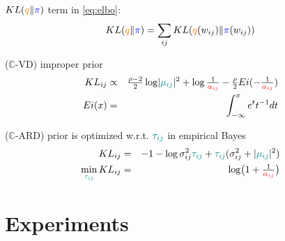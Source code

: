 \documentclass{beamer}
\newcommand{\real}{\mathbb{R}}
\newcommand{\cplx}{\mathbb{C}}
\begin{document}
\begin{frame}[c]{\insertsection}

  \bigskip
  $\mathop{KL}({\color{orange} q} \| {\color{blue} \pi})$ term in \eqref{eq:elbo}:
  \begin{equation*}
    \mathop{KL}({\color{orange} q} \| {\color{blue} \pi})
      = \sum_{ij} \mathop{KL}({\color{orange} q}(w_{ij}) \| {\color{blue} \pi}(w_{ij}))
  \end{equation*}

  \bigskip
  ($\cplx$-VD) improper prior
  \begin{eqnarray*}
    \mathop{KL}\nolimits_{ij}
      &\propto&
        \tfrac{\rho - 2}2 \log \lvert {\color{teal} \mu_{ij}} \rvert^2
        + \log \tfrac1{{\color{red} \alpha_{ij}}}
        - \tfrac\rho2 Ei( - \tfrac1{{\color{red} \alpha_{ij}}})
      \\
    Ei(x) &=& \int_{-\infty}^x e^t t^{-1} dt
  \end{eqnarray*}

  \bigskip
  ($\cplx$-ARD) prior is optimized w.r.t. ${\color{teal} \tau_{ij}}$ in empirical Bayes
  \begin{eqnarray*}
    \mathop{KL}\nolimits_{ij}
      &=& -1
        - \log \sigma^2_{ij} {\color{teal} \tau_{ij}}
        + {\color{teal} \tau_{ij}} (\sigma^2_{ij} + \lvert {\color{teal} \mu_{ij}} \rvert^2)
      \\
    \min_{{\color{teal} \tau_{ij}}} \mathop{KL}\nolimits_{ij}
      &=& \log \bigl( 1 + \tfrac1{{\color{red} \alpha_{ij}}} \bigr)
  \end{eqnarray*}
\end{frame}



\section{Experiments} %
\label{sec:experiments}
\end{document}
